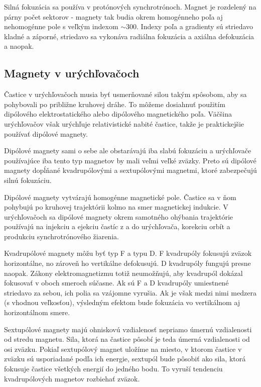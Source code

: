 \documentclass[../../main.tex]{subfiles}
\begin{document}
Silná fokuzácia sa používa v protónových synchrotrónoch. Magnet je rozdelený na párny počet sektorov - magnety tak budia okrem homogénneho poľa aj nehomogénne pole s veľkým indexom $\sim 300$. Indexy poľa a gradienty sú striedavo kladné a záporné, striedavo sa vykonáva radiálna fokuzácia a axiálna defokuzácia a naopak.

\subsection{Magnety v urýchľovačoch}

Častice v urýchľovačoch musia byť usmerňované silou takým spôsobom, aby sa pohybovali po približne kruhovej dráhe. To môžeme dosiahnuť použitím dipólového elektrostatického alebo dipólového magnetického poľa. Väčšina urýchľovačov však urýchľuje relativistické nabité častice, takže je praktickejšie používať dipólové magnety. 

Dipólové magnety sami o sebe ale obstarávajú iba slabú fokuzáciu a urýchľovače používajúce iba tento typ magnetov by mali veľmi veľké zväzky. Preto sú dipólové magnety dopĺňané kvadrupólovými a sextupólovými magnetmi, ktoré zabezpečujú silnú fokuzáciu. 

Dipólové magnety vytvárajú homogénne magnetické pole. Častice sa v ňom pohybujú po kruhovej trajektórii kolmo na smer magnetickej indukcie. V urýchľovačoch sa dipólové magnety okrem samotného ohýbania trajektórie používajú na injekciu a ejekciu častíc z a do urýchľovača, korekciu orbít a produkciu synchrotrónového žiarenia.

Kvadrupólové magnety môžu byť typ F a typu D. F kvadrupóly fokusujú zväzok horizontálne, no zároveň ho vertikálne defokusujú. D kvadrupóly fungujú presne naopak. Zákony elektromagnetizmu totiž neumožňujú, aby kvadrupól dokázal fokusovať v oboch smeroch súčasne. Ak sú F a D kvadrupóly umiestnené striedavo za sebou, ich polia sa vzájomne vyrušia. Ak je však medzi nimi medzera (s vhodnou veľkosťou), výsledným efektom bude fokuzácia vo vertikálnom aj horizontálnom smere.

Sextupólové magnety majú ohniskovú vzdialenosť nepriamo úmernú vzdialenosti od stredu magnetu. Sila, ktorá na častice pôsobí je teda úmerná vzdialenosti od osi zväzku. Pokiaľ sextupólový magnet uložíme na miesto, v ktorom častice v zväzku sú usporiadané podľa ich energie, sextupól bude pôsobiť ako sila, ktorá fokusuje častice všetkých energií do jedného bodu. To vyruší tendenciu kvadrupólových magnetov rozbiehať zväzok.
\end{document}
